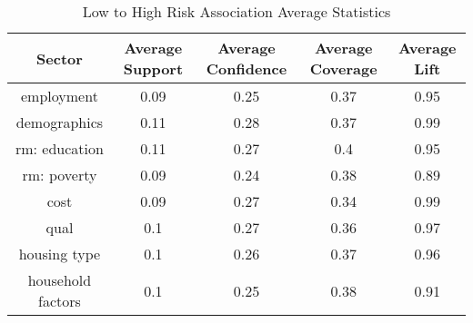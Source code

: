 \begin{table}[h]
    \centering
    \caption{Low to High Risk Association Average Statistics}
    \label{tab:low_high_risk}
    \begin{tabular}{|c|c|c|c|c|}
    \hline
    Sector & Average Support & Average Confidence & Average Coverage & Average Lift \\
    \hline
    employment & 0.09 & 0.25 & 0.37 & 0.95 \\
    \hline
    demographics & 0.11 & 0.28 & 0.37 & 0.99 \\
    \hline
    rm: education & 0.11 & 0.27 & 0.4 & 0.95 \\
    \hline
    rm: poverty & 0.09 & 0.24 & 0.38 & 0.89 \\
    \hline
    cost & 0.09 & 0.27 & 0.34 & 0.99 \\
    \hline
    qual & 0.1 & 0.27 & 0.36 & 0.97 \\
    \hline
    housing type & 0.1 & 0.26 & 0.37 & 0.96 \\
    \hline
    household factors & 0.1 & 0.25 & 0.38 & 0.91 \\
    \hline
    \end{tabular}

    \end{table}